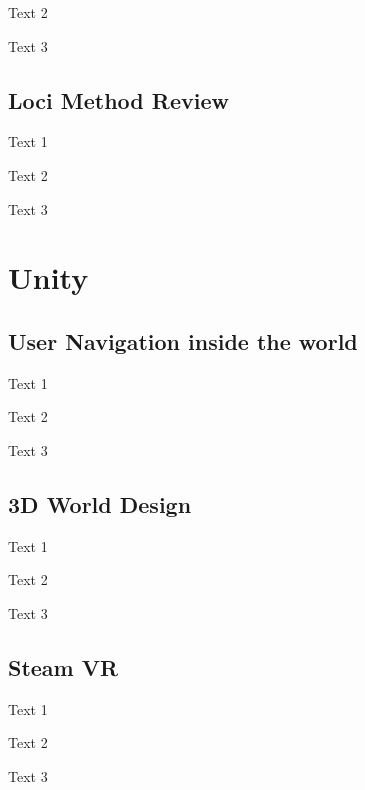 Text 2

Text 3

\subsection{Loci Method Review} \label{sec:d3.12}
Text 1

Text 2

Text 3

\section{Unity} \label{sec:d4}

\subsection{User Navigation inside the world} \label{sec:d4.1}
Text 1

Text 2

Text 3

\subsection{3D World Design} \label{sec:d4.2}
Text 1

Text 2

Text 3

\subsection{Steam VR} \label{sec:d4.3}
Text 1

Text 2

Text 3